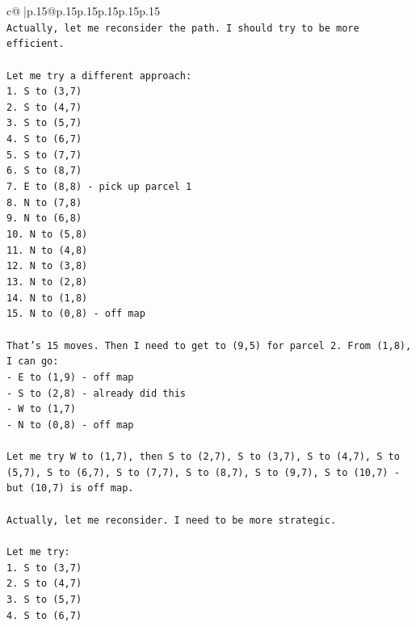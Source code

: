 \documentclass{article}
\begin{document}
{\begin{supertabular}{c@{$\;$}|p{.15\linewidth}@{}p{.15\linewidth}p{.15\linewidth}p{.15\linewidth}p{.15\linewidth}p{.15\linewidth}}
{{{\\ 
\texttt{Actually, let me reconsider the path. I should try to be more efficient.} \\
\\ 
\texttt{Let me try a different approach:} \\
\texttt{1. S to (3,7)} \\
\texttt{2. S to (4,7)} \\
\texttt{3. S to (5,7)} \\
\texttt{4. S to (6,7)} \\
\texttt{5. S to (7,7)} \\
\texttt{6. S to (8,7)} \\
\texttt{7. E to (8,8) {-} pick up parcel 1} \\
\texttt{8. N to (7,8)} \\
\texttt{9. N to (6,8)} \\
\texttt{10. N to (5,8)} \\
\texttt{11. N to (4,8)} \\
\texttt{12. N to (3,8)} \\
\texttt{13. N to (2,8)} \\
\texttt{14. N to (1,8)} \\
\texttt{15. N to (0,8) {-} off map} \\
\\ 
\texttt{That's 15 moves. Then I need to get to (9,5) for parcel 2. From (1,8), I can go:} \\
\texttt{{-} E to (1,9) {-} off map} \\
\texttt{{-} S to (2,8) {-} already did this} \\
\texttt{{-} W to (1,7)} \\
\texttt{{-} N to (0,8) {-} off map} \\
\\ 
\texttt{Let me try W to (1,7), then S to (2,7), S to (3,7), S to (4,7), S to (5,7), S to (6,7), S to (7,7), S to (8,7), S to (9,7), S to (10,7) {-} but (10,7) is off map.} \\
\\ 
\texttt{Actually, let me reconsider. I need to be more strategic.} \\
\\ 
\texttt{Let me try:} \\
\texttt{1. S to (3,7)} \\
\texttt{2. S to (4,7)} \\
\texttt{3. S to (5,7)} \\
\texttt{4. S to (6,7)} \\
}}}
\end{supertabular}}
\end{document}

